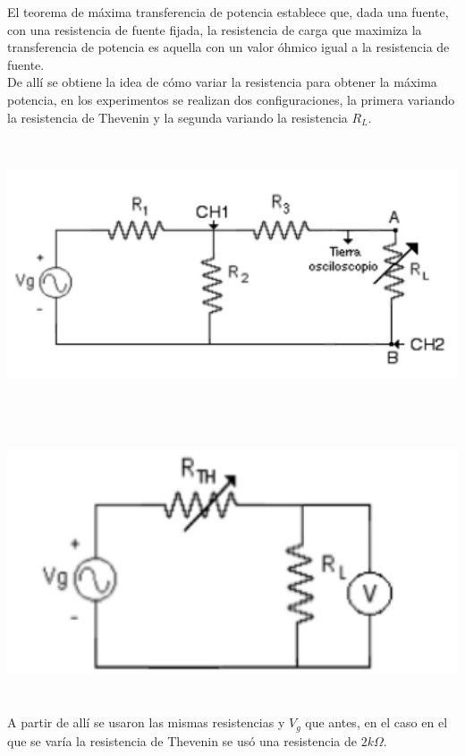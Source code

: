 \documentclass[12pt]{article}
\begin{document}
\begin{enumerate}
		El teorema de máxima transferencia de potencia establece que, dada una fuente, con una resistencia de fuente fijada, la resistencia de carga que maximiza la transferencia de potencia es aquella con un valor óhmico igual a la resistencia de fuente.\\
		
		De allí se obtiene la idea de cómo variar la resistencia para obtener la máxima potencia, en los experimentos se realizan dos configuraciones, la primera variando la resistencia de Thevenin y la segunda variando la resistencia $R_L$.
		
		\begin{center}
			\includegraphics[width=16cm,height=8cm]{Img/circ_2}
		\end{center}
	
		\begin{center}
			\includegraphics[width=16cm,height=8cm]{Img/circ_3}
		\end{center}
	
		A partir de allí se usaron las mismas resistencias y $V_g$ que antes, en el caso en el que se varía la resistencia de Thevenin se usó una resistencia de $2k\Omega$.
		

\end{enumerate}
\end{document}
